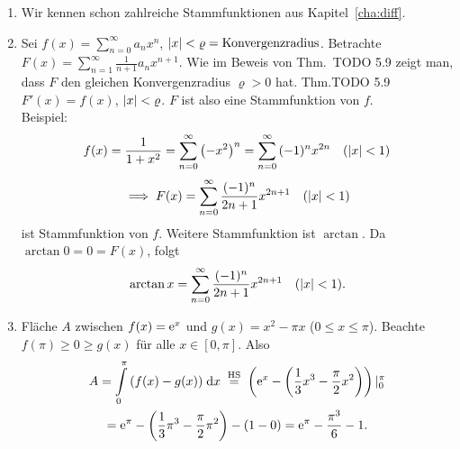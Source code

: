 \documentclass[12pt]{scrreprt}
\begin{document}
\begin{bsp}
  \label{bsp:int.stammfkt}
  \begin{enumerate}
    \item \label{bsp:int.stammfkt.a} Wir kennen schon zahlreiche
      Stammfunktionen aus Kapitel~\ref{cha:diff}.
    \item \label{bsp:int.stammfkt.b} Sei
      $f(x)=\sum_{n=0}^{\infty}{a_nx^n}$,
      $\left\lvert x\right\lvert<\varrho=\mathrm{Konvergenzradius}$. Betrachte
      $F(x)=\sum_{n=1}^{\infty}{\frac{1}{n+1}a_nx^{n+1}}$. Wie im
      Beweis von Thm.~TODO 5.9 zeigt man, dass $F$ den gleichen
      Konvergenzradius $\varrho>0$ hat. Thm.TODO 5.9 \folgt $F'(x)=f(x)$,
      $\left\lvert x\right\lvert<\varrho$. $F$ ist also eine Stammfunktion von $f$.\\
      Beispiel:
      \[f(x)=\frac{1}{1+x^2} =
      \sum_{n=0}^{\infty}{\left(-x^2\right)^n}=\sum_{n=0}^{\infty}{(-1)^nx^{2n}}\quad
      (\left\lvert x\right\lvert<1) \]
      \[\implies F(x)=\sum_{n=0}^{\infty}{\frac{(-1)^n}{2n+1}x^{2n+1}}\quad
      (\left\lvert x\right\lvert<1) \]
      ist Stammfunktion von $f$. Weitere Stammfunktion ist
      $\arctan$. Da $\arctan{0}=0=F(x)$, folgt
      \[\arctan{x}=\sum_{n=0}^{\infty}{\frac{(-1)^n}{2n+1}x^{2n+1}}\quad
      (\left\lvert x\right\lvert<1). \]
    \item Fläche $A$ zwischen $f(x)=\mathrm{e}^x$ und $g(x)=x^2-\pi x$ ($0\le
      x\le\pi$). Beachte $f(\pi)\ge0\ge g(x)$ für alle
      $x\in[0,\pi]$. Also \begin{multline*}A=\Integral{0}{\pi}{(f(x)-g(x))}{x}
      \nach{=}{HS}
      \left(\e^x-\left(\frac13x^3-\frac\pi2x^2\right)\right)|_0^\pi \\=
      \e^\pi-\left(\frac13\pi^3-\frac\pi2\pi^2\right) - (1-0) =
      \e^\pi-\frac{\pi^3}{6}-1.\end{multline*}
  \end{enumerate}
\end{bsp}

\begin{satz}
  \label{satz:int.pi}

\end{satz}

\begin{bsp}
  \label{bsp:int.pi}

\end{bsp}

\begin{satz}
  \label{satz:int.subst}

\end{satz}

\begin{bsp}
  \label{bsp:int.subst}

\end{bsp}
\end{document}
